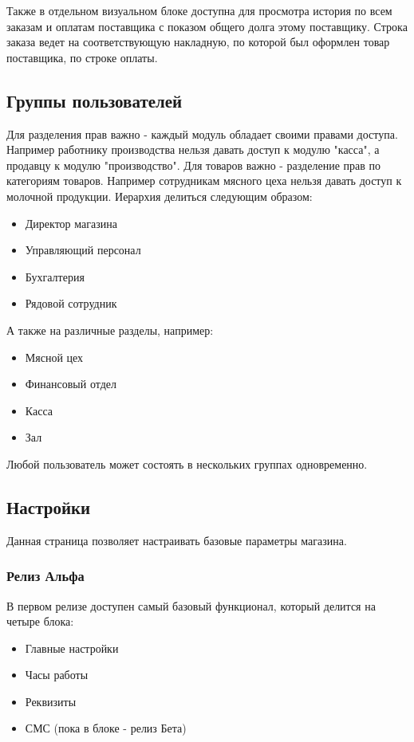 \documentclass[DIV=calc, paper=a4, fontsize=11pt]{scrartcl} %
\begin{document}
Также в отдельном визуальном блоке доступна для просмотра история по всем заказам и оплатам поставщика с показом общего долга этому поставщику. Строка заказа ведет на соответствующую накладную, по которой был оформлен товар поставщика, по строке оплаты.


\subsection{Группы пользователей}

Для разделения прав важно - каждый модуль обладает своими правами доступа. Например работнику производства нельзя давать доступ к модулю "касса", а продавцу к модулю "производство".
Для товаров важно - разделение прав по категориям товаров. Например сотрудникам мясного цеха нельзя давать доступ к молочной продукции.
Иерархия делиться следующим образом:

\begin{itemize}
	\item Директор магазина
	\item Управляющий персонал
	\item Бухгалтерия
	\item Рядовой сотрудник
\end{itemize}

А также на различные разделы, например:

\begin{itemize}
	\item Мясной цех
	\item Финансовый отдел
	\item Касса
	\item Зал
\end{itemize}

Любой пользователь может состоять в нескольких группах одновременно.

\subsection{Настройки}

Данная страница позволяет настраивать базовые параметры магазина.

\subsubsection{Релиз Альфа}

В первом релизе доступен самый базовый функционал, который делится на четыре блока:

\begin{itemize}
	\item Главные настройки
	\item Часы работы
	\item Реквизиты
	\item СМС (пока в блоке - релиз Бета)
\end{itemize}
\end{document}
